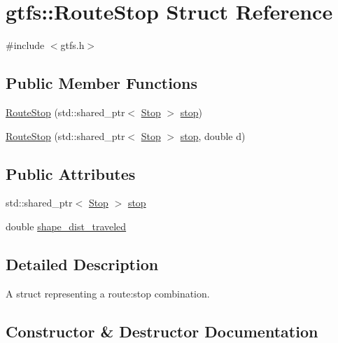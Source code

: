 \hypertarget{structgtfs_1_1RouteStop}{}\section{gtfs\+:\+:Route\+Stop Struct Reference}
\label{structgtfs_1_1RouteStop}


{\ttfamily \#include $<$gtfs.\+h$>$}

\subsection*{Public Member Functions}
\begin{DoxyCompactItemize}
\item 
\hyperlink{structgtfs_1_1RouteStop_a6ec05e2393ac8980e5c8a71d74c6d70d}{Route\+Stop} (std\+::shared\+\_\+ptr$<$ \hyperlink{classgtfs_1_1Stop}{Stop} $>$ \hyperlink{structgtfs_1_1RouteStop_af70ced2604121bbeb159da66bbd00c64}{stop})
\item 
\hyperlink{structgtfs_1_1RouteStop_a5f3dba72665e9731bad7a844bee4a949}{Route\+Stop} (std\+::shared\+\_\+ptr$<$ \hyperlink{classgtfs_1_1Stop}{Stop} $>$ \hyperlink{structgtfs_1_1RouteStop_af70ced2604121bbeb159da66bbd00c64}{stop}, double d)
\end{DoxyCompactItemize}
\subsection*{Public Attributes}
\begin{DoxyCompactItemize}
\item 
std\+::shared\+\_\+ptr$<$ \hyperlink{classgtfs_1_1Stop}{Stop} $>$ \hyperlink{structgtfs_1_1RouteStop_af70ced2604121bbeb159da66bbd00c64}{stop}
\item 
double \hyperlink{structgtfs_1_1RouteStop_ab738c008a00eab17953ab124a86ca207}{shape\+\_\+dist\+\_\+traveled}
\end{DoxyCompactItemize}


\subsection{Detailed Description}
A struct representing a route\+:stop combination. 

\subsection{Constructor \& Destructor Documentation}
\mbox{\label{structgtfs_1_1RouteStop_a6ec05e2393ac8980e5c8a71d74c6d70d}} 
